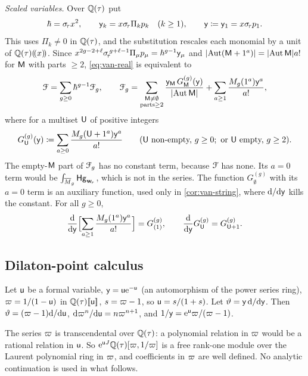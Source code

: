 \emph{Scaled variables.} Over $\mathbb{Q}(\tau)$ put
\[
\hbar=\sigma_{\!\tau} x^2,\qquad \mathsf{y}_k=x\sigma_{\!\tau}\Pi_kp_k\quad(k\geq 1),\qquad \mathsf{y}\coloneqq\mathsf{y}_1=x\sigma_{\!\tau} p_1.
\]
This uses $\Pi_k\neq 0$ in $\mathbb{Q}(\tau)$, and the substitution rescales each monomial by a unit of $\mathbb{Q}(\tau)(\!(x)\!)$. Since $x^{2g-2+\ell}\sigma_{\!\tau}^{\,g+\ell-1}\Pi_\mu p_\mu=\hbar^{g-1}\mathsf{y}_\mu$ and $\lvert\operatorname{Aut}(\mathsf{M}+1^a)\rvert=\lvert\operatorname{Aut}\mathsf{M}\rvert a!$ for $\mathsf{M}$ with parts $\geq 2$, \eqref{eq:van-real} is equivalent to
\begin{equation}\label{eq:van-scaled}
\mathcal{F}=\sum_{g\geq 0}\hbar^{g-1}\mathcal{F}_g,\qquad
\mathcal{F}_g=\sum_{\substack{\mathsf{M}\neq\emptyset\\\text{parts}\geq 2}}\frac{\mathsf{y}_{\mathsf{M}}\,G^{(g)}_{\mathsf{M}}(\mathsf{y})}{\lvert\operatorname{Aut}\mathsf{M}\rvert}+\sum_{a\geq 1}\frac{M_g(1^a)\mathsf{y}^a}{a!},
\end{equation}
where for a multiset $\mathsf{U}$ of positive integers
\begin{equation}\label{eq:van-G}
G^{(g)}_{\mathsf{U}}(\mathsf{y})\coloneqq\sum_{a\geq 0}\frac{M_g(\mathsf{U}+1^a)\mathsf{y}^a}{a!}\qquad(\mathsf{U}\text{ non-empty, }g\geq 0;\text{ or }\mathsf{U}\text{ empty, }g\geq 2).
\end{equation}
The empty-$\mathsf{M}$ part of $\mathcal{F}_g$ has no constant term, because $\mathcal{F}$ has none. Its $a=0$ term would be $\int_{\overline{M}_g}\mathsf{Hg}_{\mathbf{w}_{\!\tau}}$, which is not in the series. The function $G^{(g)}_{\emptyset}$ with its $a=0$ term is an auxiliary function, used only in \cref{cor:van-string}, where $\mathrm{d}/\mathrm{d}\mathsf{y}$ kills the constant. For all $g\geq 0$,
\begin{equation}\label{eq:van-Gd}
\frac{\mathrm{d}}{\mathrm{d}\mathsf{y}}\Bigl[\sum_{a\geq 1}\frac{M_g(1^a)\mathsf{y}^a}{a!}\Bigr]=G^{(g)}_{(1)},\qquad \frac{\mathrm{d}}{\mathrm{d}\mathsf{y}}G^{(g)}_{\mathsf{U}}=G^{(g)}_{\mathsf{U}+1}.
\end{equation}

\subsection{Dilaton-point calculus}
\label{sec:van-dil}

Let $\mathsf{u}$ be a formal variable, $\mathsf{y}=\mathsf{u}\mathrm{e}^{-\mathsf{u}}$ (an automorphism of the power series ring), $\varpi=1/(1-\mathsf{u})$ in $\mathbb{Q}(\tau)[\![ \mathsf{u} ]\!]$, $s=\varpi-1$, so $\mathsf{u}=s/(1+s)$. Let $\vartheta=\mathsf{y}\,\mathrm{d}/\mathrm{d}\mathsf{y}$. Then $\vartheta=(\varpi-1)\mathrm{d}/\mathrm{d}\mathsf{u}$, $\mathrm{d}\varpi^n/\mathrm{d}\mathsf{u}=n\varpi^{n+1}$, and $1/\mathsf{y}=\mathrm{e}^{\mathsf{u}}\varpi/(\varpi-1)$.

The series $\varpi$ is transcendental over $\mathbb{Q}(\tau)$: a polynomial relation in $\varpi$ would be a rational relation in $\mathsf{u}$. So $\mathrm{e}^{\mathsf{u} J}\mathbb{Q}(\tau)[\varpi,1/\varpi]$ is a free rank-one module over the Laurent polynomial ring in $\varpi$, and coefficients in $\varpi$ are well defined. No analytic continuation is used in what follows.

